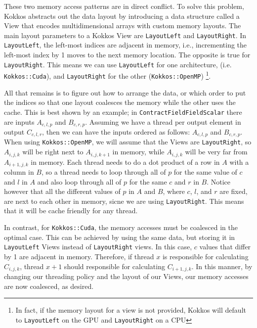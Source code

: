 These two memory access patterns are in direct conflict. To solve this problem, Kokkos
abstracts out the data layout by introducing a data structure called a View that encodes 
multidimensional arrays with custom memory layouts. The main layout parameters to a Kokkos View
are \texttt{LayoutLeft} and \texttt{LayoutRight}. In \texttt{LayoutLeft}, the left-most indices are
adjacent in memory, i.e., incrementing the left-most index by 1 moves to the next memory location.
The opposite is true for \texttt{LayoutRight}.
This means we can use \texttt{LayoutLeft} for one architecture, (i.e.
\texttt{Kokkos::Cuda}), and \texttt{LayoutRight} for the other (\texttt{Kokkos::OpenMP})
\footnote{In fact, if the memory layout for a view is not provided, Kokkos will default
to \texttt{LayoutLeft} on the GPU and \texttt{LayoutRight} on a CPU}. 

All that remains is to
figure out how to arrange the data, or which order to put the indices so that
one layout coalesces the memory while the other uses the cache. This is best
shown by an example; in \texttt{ContractFieldFieldScalar} there are inputs $A_{c, l, p}$
and $B_{c, r, p}$. Assuming we have a thread per output element in output
$C_{c, l, r}$, then we can have the inputs ordered as follows: $A_{c, l, p}$
and $B_{c, r, p}$. When using \texttt{Kokkos::OpenMP}, we will assume that the Views are \texttt{LayoutRight}, so
$A_{i, j, k}$ will be right next to $A_{i, j, k+1}$ in memory, while $A_{i, j,
k}$ will be very far from $A_{i+1, j, k}$ in memory. Each thread needs to do a
dot product of a row in $A$ with a column in $B$, so a thread needs to loop
through all of $p$ for the same value of $c$ and $l$ in $A$ and also loop
through all of $p$ for the same $c$ and $r$ in $B$. Notice however that all the
different values of $p$ in $A$ and $B$, where $c$, $l$, and $r$ are fixed, are
next to each other in memory, sicne we are using \texttt{LayoutRight}. This means that it will be cache friendly for any
thread. 

In contrast, for \texttt{Kokkos::Cuda}, the memory accesses must
be coalesced in the optimal case. 
This can be achieved by using the same data, but storing it in \texttt{LayoutLeft} Views
instead of \texttt{LayoutRight} views. In this case, $c$ values that differ by 1 are adjacent in memory.
Therefore, if thread $x$ is
responsible for calculating $C_{i, j, k}$, thread $x+1$ should responsible for
calculating $C_{i+1, j, k}$. In this manner, by changing our threading policy and 
the layout of our Views, our memory accesses are now coalesced, as desired. 

